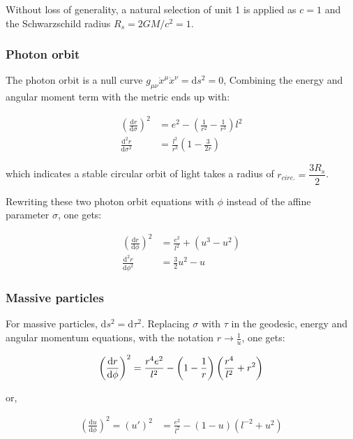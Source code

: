 Without loss of generality, a natural selection of unit 1 is applied as $c = 1$ and the Schwarzschild radius $R_s = 2 GM / c^2 = 1$. 

\subsubsection{Photon orbit}
The photon orbit is a null curve $g_{\mu\nu}\dot{x}^\mu\dot{x}^\nu = \mathrm{d}s^2 = 0$, 
Combining the energy and angular moment term with the metric ends up with:

\begin{align}
\left(\frac{\mathrm{d}r}{\mathrm{d}\sigma}\right)^2 &= e^2 -   \left( \frac{1}{r^2} -\frac{1}{r^3} \right) l^2 \\
\frac{\mathrm{d^2}r}{\mathrm{d}\sigma^2} &= \frac{l^2}{r^3} \left( 1-\frac{3}{2r} \right)
\end{align}

which indicates a stable circular orbit of light takes a radius of $r_{\mathit{circ.}} = \dfrac{3R_s}{2}$.

Rewriting these two photon orbit equations with $\phi$ instead of the affine parameter $\sigma$, one gets:

\begin{align}
\left(\frac{\mathrm{d}r}{\mathrm{d}\phi}\right)^2 &= \frac{e^2}{l^2} + (u^3 - u^2) \\
\frac{\mathrm{d^2}r}{\mathrm{d}\phi^2} &= \frac{3}{2}u^2 - u
\end{align}

\subsubsection{Massive particles}
For massive particles, $\mathrm{d}s^2 = \mathrm{d}\tau^2$. Replacing $\sigma$ with $\tau$ in the geodesic, energy and angular momentum equations, with the notation $r \to \frac{1}{u}$, one gets:

\begin{equation}
\left(\frac{\mathrm{d}r}{\mathrm{d}\phi}\right)^2 = \frac{r^4 e^2}{l^2} - \left( 1-\frac{1}{r} \right) \left( \frac{r^4}{l^2} + r^2 \right) \notag
\end{equation}

or,

\begin{align}
\left(\frac{\mathrm{d}u}{\mathrm{d}\phi}\right)^2 = (u')^2 &= \frac{e^2}{l^2} - ( 1-u ) ( l^{-2} + u^2 )
\end{align}

